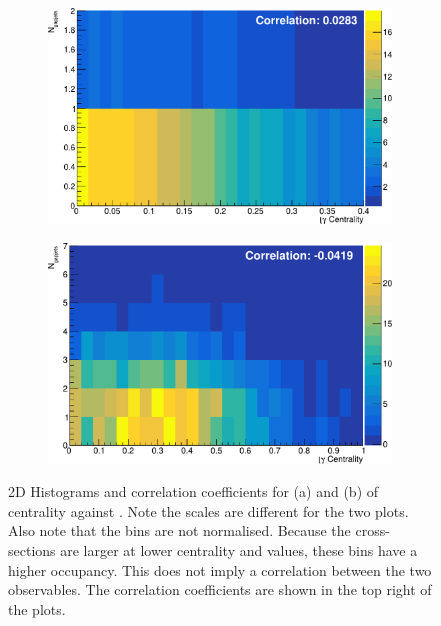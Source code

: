 \begin{figure}[t]
\centering
\begin{subfigure}[b]{0.48\textwidth}
    \centering
    \includegraphics[width=\textwidth]{plots/diffx/correlations_ew.pdf}
    \caption{}
\end{subfigure}
\hfill
\begin{subfigure}[b]{0.48\textwidth}
    \centering
    \includegraphics[width=\textwidth]{plots/diffx/correlations_qcd.pdf}
    \caption{}
\end{subfigure}
\caption{2D Histograms and correlation coefficients for \ewwy (a) and \qcdwy (b) of \xily centrality against \ngapjets. Note the scales are different for the two plots. Also note that the bins are not normalised. Because the cross-sections are larger at lower centrality and \ngapjets values, these bins have a higher occupancy. This does not imply a correlation between the two observables. The correlation coefficients are shown in the top right of the plots. \label{fig:vbswy:correlation}}
\end{figure}

